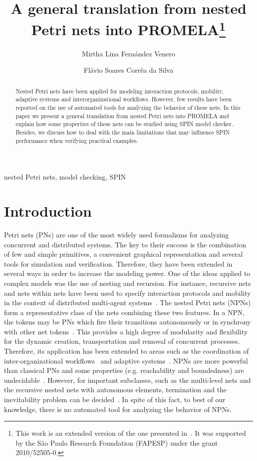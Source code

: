 \documentclass{llncs}
\title{A general translation from nested Petri nets into PROMELA\thanks{This work is an extended version of the one presented in~\cite{venero2013a}. It was supported by the S\~ao Paulo Research Foundation (FAPESP) under the grant 2010/52505-0.}}
\author{{Mirtha Lina Fern\'andez Venero} \and {Fl\'avio Soares Corr\^ea da Silva} }
\institute{Department of Computer Science, University of S\~ao Paulo, Brazil, 05508-090 \email{\{mirtha, fcs\}@ime.usp.br} }
\newenvironment{keywords}{
       \list{}{\advance\topsep by0.35cm\relax\small
       \leftmargin=1cm
       \labelwidth=0.35cm
       \listparindent=0.35cm
       \itemindent\listparindent
       \rightmargin\leftmargin}\item[\hskip\labelsep
                                     \bfseries Keywords:]}
     {\endlist}
\begin{document}
\maketitle
\thispagestyle{empty}
\pagestyle{plain}

\newcommand{\mfont}{\fontsize{7.5pt}{7.5pt}\selectfont}
\newcommand{\nfont}{\normalsize}



\begin{abstract}
Nested Petri nets have been applied for modeling interaction protocols, mobility, adaptive systems and interorganizational workflows. However, few results have been reported on the use of automated tools for analyzing  the behavior of these nets. In this paper we present a general translation from nested Petri nets into PROMELA and explain how some properties of these nets can be studied using SPIN model checker. Besides, we discuss how to deal with the main limitations that may influence SPIN performance when verifying practical examples.
\end{abstract}


\begin{keywords}
nested Petri nets, model checking, SPIN
\end{keywords}

\section{Introduction}
\label{sec:int}

Petri nets (PNs) are one of the most widely used formalisms for analyzing concurrent and distributed systems. The key to their success is the combination of few and simple primitives, a convenient graphical representation and several tools for simulation and verification. Therefore, they have been extended in several ways in order to increase the modeling power. One of the ideas applied to complex models was the use of nesting and recursion. For instance, recursive nets and nets within nets have been used to specify interaction protocols and mobility in the context of distributed multi-agent systems~\cite{Seghrouchni96recursive,Mazouzi:2002,mobil2003,Kissoum:2008}. The nested Petri nets (NPNs) form a representative class of the nets combining these two features. In a NPN, the tokens may be PNs which fire their transitions autonomously or in synchrony with other net tokens~\cite{Lomazova01:fi}. This provides a high degree of modularity and flexibility for the dynamic creation, transportation and removal of concurrent processes. Therefore, its application has been extended to areas such as the coordination of inter-organizational workflows~\cite{iowf-npn} and adaptive systems~\cite{Lomazova08}. NPNs are more powerful than classical PNs and some properties (e.g. reachability and boundedness) are undecidable~\cite{Lomazova00}. However, for important subclasses, such as the multi-level nets and the recursive nested nets with autonomous elements, termination and the inevitability problem can be decided~\cite{Lomazova01:fi}. In spite of this fact, to best of our knowledge, there is no automated tool for analyzing the behavior of NPNs.
\end{document}
